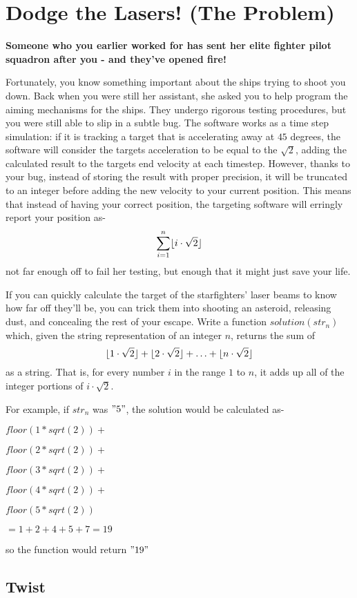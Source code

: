 \documentclass[12pt]{article}
\DeclarePairedDelimiter\floor{\lfloor}{\rfloor}
\begin{document}
\section*{Dodge the Lasers! (The Problem)}
{\bfseries Someone who you earlier worked for has sent her elite
fighter pilot squadron after you - and they've opened fire!

Fortunately, you know something important about the ships trying to
shoot you down. Back when you were still her assistant, she asked 
you to help program the aiming mechanisms for the ships. They 
undergo rigorous testing procedures, but you were still able to slip
in a subtle bug. The software works as a time step simulation: if it is tracking a target that is accelerating away at $45$ degrees, the
software will consider the targets acceleration to be equal to the
$\sqrt{2}$, adding the calculated result to the targets end velocity
at each timestep. However, thanks to your bug, instead of storing
the result with proper precision, it will be truncated to an integer
before adding the new velocity to your current position.  This means
that instead of having your correct position, the targeting software
will erringly report your position as-
$$\sum_{i=1}^n \floor{i \cdot \sqrt{2}}$$
not far enough off to fail her testing, but enough that it might
just save your life.

If you can quickly calculate the target of the starfighters' laser
beams to know how far off they'll be, you can trick them into
shooting an asteroid, releasing dust, and concealing the rest of
your escape.  Write a function $solution(str_n)$ which, given the string representation of an integer $n$, returns the sum of
$$\floor{1 \cdot \sqrt{2}} + \floor{2 \cdot \sqrt{2}} + \ldots + \floor{n \cdot \sqrt{2}}$$
as a string. That is, for every number $i$ in the range $1$ to $n$,
it adds up all of the integer portions of $i \cdot \sqrt{2}$.

For example, if $str_n$ was $"5"$, the solution would be calculated 
as-

$floor(1*sqrt(2)) +$

$floor(2*sqrt(2)) +$

$floor(3*sqrt(2)) +$

$floor(4*sqrt(2)) +$

$floor(5*sqrt(2))$

$= 1+2+4+5+7 = 19$

so the function would return $"19"$
}

\subsection*{Twist}
\end{document}
